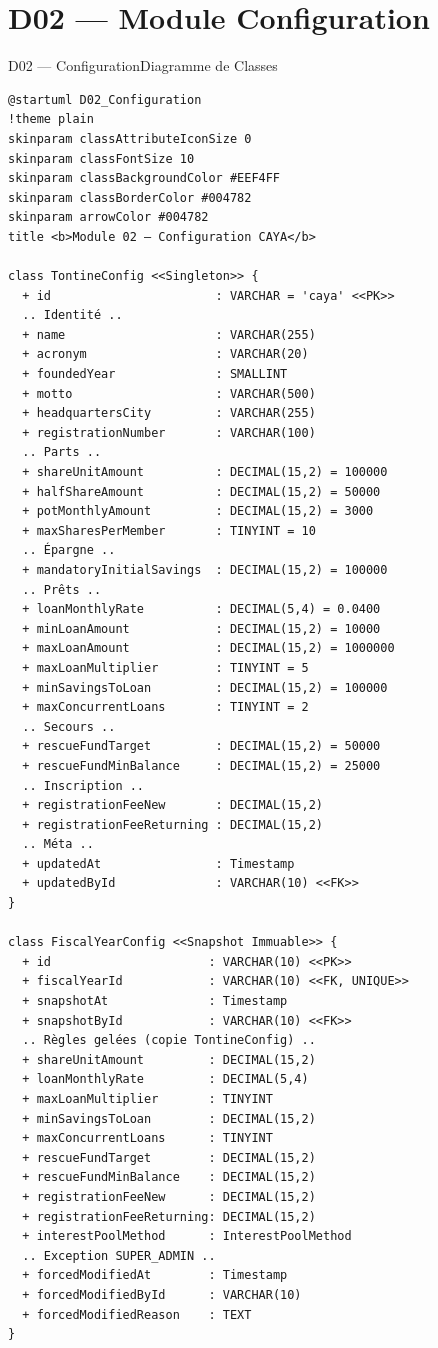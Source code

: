 \documentclass[12pt, a4paper]{report}
\begin{document}
\section{D02 — Module Configuration}

\begin{diagramBox}{D02 — Configuration}{Diagramme de Classes}
\begin{lstlisting}
@startuml D02_Configuration
!theme plain
skinparam classAttributeIconSize 0
skinparam classFontSize 10
skinparam classBackgroundColor #EEF4FF
skinparam classBorderColor #004782
skinparam arrowColor #004782
title <b>Module 02 — Configuration CAYA</b>

class TontineConfig <<Singleton>> {
  + id                       : VARCHAR = 'caya' <<PK>>
  .. Identité ..
  + name                     : VARCHAR(255)
  + acronym                  : VARCHAR(20)
  + foundedYear              : SMALLINT
  + motto                    : VARCHAR(500)
  + headquartersCity         : VARCHAR(255)
  + registrationNumber       : VARCHAR(100)
  .. Parts ..
  + shareUnitAmount          : DECIMAL(15,2) = 100000
  + halfShareAmount          : DECIMAL(15,2) = 50000
  + potMonthlyAmount         : DECIMAL(15,2) = 3000
  + maxSharesPerMember       : TINYINT = 10
  .. Épargne ..
  + mandatoryInitialSavings  : DECIMAL(15,2) = 100000
  .. Prêts ..
  + loanMonthlyRate          : DECIMAL(5,4) = 0.0400
  + minLoanAmount            : DECIMAL(15,2) = 10000
  + maxLoanAmount            : DECIMAL(15,2) = 1000000
  + maxLoanMultiplier        : TINYINT = 5
  + minSavingsToLoan         : DECIMAL(15,2) = 100000
  + maxConcurrentLoans       : TINYINT = 2
  .. Secours ..
  + rescueFundTarget         : DECIMAL(15,2) = 50000
  + rescueFundMinBalance     : DECIMAL(15,2) = 25000
  .. Inscription ..
  + registrationFeeNew       : DECIMAL(15,2)
  + registrationFeeReturning : DECIMAL(15,2)
  .. Méta ..
  + updatedAt                : Timestamp
  + updatedById              : VARCHAR(10) <<FK>>
}

class FiscalYearConfig <<Snapshot Immuable>> {
  + id                      : VARCHAR(10) <<PK>>
  + fiscalYearId            : VARCHAR(10) <<FK, UNIQUE>>
  + snapshotAt              : Timestamp
  + snapshotById            : VARCHAR(10) <<FK>>
  .. Règles gelées (copie TontineConfig) ..
  + shareUnitAmount         : DECIMAL(15,2)
  + loanMonthlyRate         : DECIMAL(5,4)
  + maxLoanMultiplier       : TINYINT
  + minSavingsToLoan        : DECIMAL(15,2)
  + maxConcurrentLoans      : TINYINT
  + rescueFundTarget        : DECIMAL(15,2)
  + rescueFundMinBalance    : DECIMAL(15,2)
  + registrationFeeNew      : DECIMAL(15,2)
  + registrationFeeReturning: DECIMAL(15,2)
  + interestPoolMethod      : InterestPoolMethod
  .. Exception SUPER_ADMIN ..
  + forcedModifiedAt        : Timestamp
  + forcedModifiedById      : VARCHAR(10)
  + forcedModifiedReason    : TEXT
}


\end{lstlisting}
\end{diagramBox}
\end{document}
